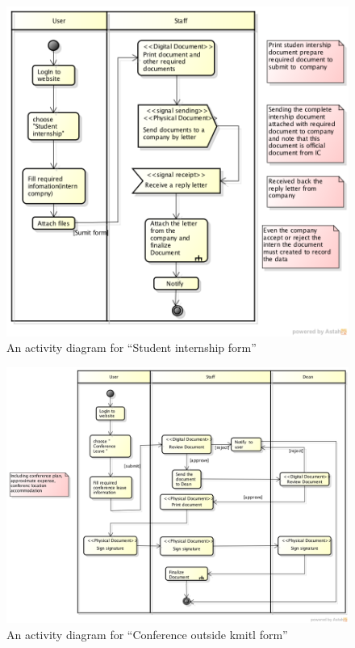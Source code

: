 \begin{figure}
	\centering
	\caption{An activity diagram for \enquote{Student internship form}}
	\label{fig:diagram-student-internship}
	\includegraphics[scale=0.7]{res/requirement/student_internship}
\end{figure}

\begin{figure}
	\centering
	\caption{An activity diagram for \enquote{Conference outside \gls{kmitl} form}}
	\label{fig:diagram-conference}
	\includegraphics[scale=0.5]{res/requirement/conference}
\end{figure}

